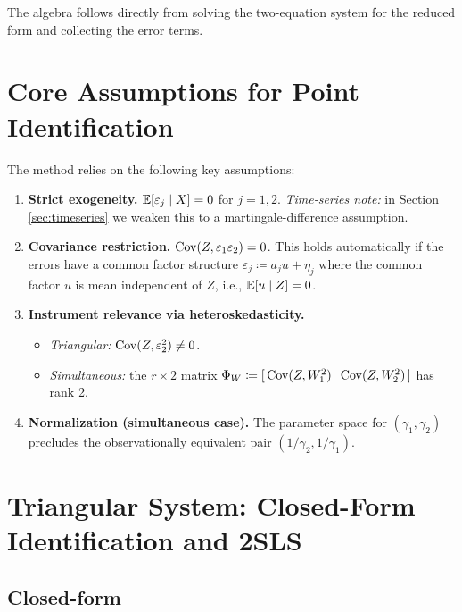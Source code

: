 \begin{remark} The algebra follows directly from solving the two-equation
system for the reduced form and collecting the error terms. \end{remark}

\section{Core Assumptions for Point Identification}

The method relies on the following key assumptions:

\begin{enumerate}[label=(A\arabic*)]
\item \label{enu:exogeneity}\textbf{Strict exogeneity.} $\mathbb{E}[\varepsilon_{j}\mid X]=0$
for $j=1,2$. \emph{Time-series note:} in Section \ref{sec:timeseries}
we weaken this to a martingale-difference assumption.
\item \label{enu:error_covariance}\textbf{Covariance restriction.} $\operatorname{Cov}(Z,\varepsilon_{1}\varepsilon_{2})=0$.
This holds automatically if the errors have a common factor structure
$\varepsilon_{j}\coloneqq a_{j}u+\eta_{j}$ where the common factor
$u$ is mean independent of $Z$, i.e., $\mathbb{E}[u\mid Z]=0$.
\item \label{enu:het}\textbf{Instrument relevance via heteroskedasticity.}
\begin{itemize}
\itemsep2pt
\item \emph{Triangular:} $\operatorname{Cov}(Z,\varepsilon_{2}^{2})\neq0$.
\item \emph{Simultaneous:} the $r\times2$ matrix $\Phi_{W}\coloneqq[\,\operatorname{Cov}(Z,W_{1}^{2})\;\;\operatorname{Cov}(Z,W_{2}^{2})\,]$
has rank 2.
\end{itemize}
\item \textbf{\label{enu:norm}Normalization (simultaneous case).} The parameter
space for $(\gamma_{1},\gamma_{2})$ precludes the observationally
equivalent pair $(1/\gamma_{2},1/\gamma_{1})$.
\end{enumerate}

\section{Triangular System: Closed-Form Identification and 2SLS}

\subsection{Closed-form}

